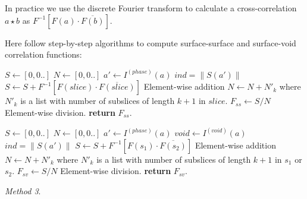 \documentclass[reprint,amsmath,amssymb,aps,pre]{revtex4-1}
\begin{document}
In practice we use the discrete Fourier transform to calculate a
cross-correlation $a \star b$ as $F^{-1} [F(a) \cdot \overline{F(b)}]$.

Here follow step-by-step algorithms to compute surface-surface and surface-void
correlation functions:
\begin{algorithmic}[1]
  \State $S \gets [0,0..]$
  \State $N \gets [0,0..]$
  \State $a' \gets I^{(phase)}(a)$
  \State $ind = \|S(a')\|$
  \State $S \gets S + F^{-1}[F(slice) \cdot \overline{F(slice)}]$
  \Comment Element-wise addition
  \State $N \gets N + N'_k$ \quad where $N'_k$ is a list with number of subslices of length $k+1$ in $slice$.
  \EndFor
  \State $F_{ss} \gets S/N$
  \Comment Element-wise division.
  \State \textbf{return} $F_{ss}$.
  \EndProcedure
\end{algorithmic}

\begin{algorithmic}[1]
  \State $S \gets [0,0..]$
  \State $N \gets [0,0..]$
  \State $a' \gets I^{(phase)}(a)$
  \State $void \gets I^{(void)}(a)$
  \State $ind = \|S(a')\|$
  \State $S \gets S + F^{-1}[F(s_1) \cdot \overline{F(s_2)}]$
  \Comment Element-wise addition
  \State $N \gets N + N'_k$ \quad where $N'_k$ is a list with number of
  subslices of length $k+1$ in $s_1$ or $s_2$.
  \EndFor
  \State $F_{sv} \gets S/N$
  \Comment Element-wise division.
  \State \textbf{return} $F_{sv}$.
  \EndProcedure
\end{algorithmic}

\textit{Method 3}.
\end{document}

